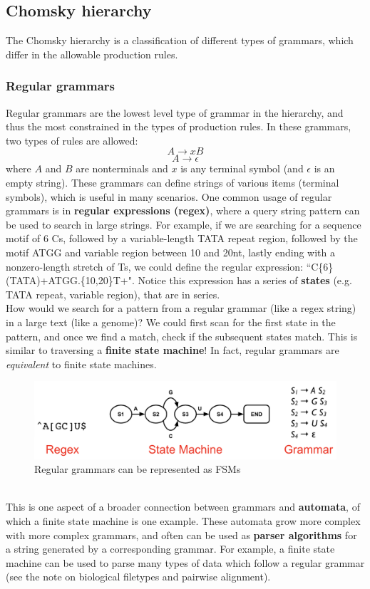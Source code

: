 \documentclass[12pt]{article}
\begin{document}
\subsection{Chomsky hierarchy}
The Chomsky hierarchy is a classification of different types of grammars, which differ in the allowable production rules.
\subsubsection{Regular grammars}
Regular grammars are the lowest level type of grammar in the hierarchy, and thus the most constrained in the types of production rules. In these grammars, two types of rules are allowed:
$$A \rightarrow xB$$
$$A \rightarrow \epsilon$$
where $A$ and $B$ are nonterminals and $x$ is any terminal symbol (and $\epsilon$ is an empty string). These grammars can define strings of various items (terminal symbols), which is useful in many scenarios. One common usage of regular grammars is in \textbf{regular expressions (regex)}, where a query string pattern can be used to search in large strings. For example, if we are searching for a sequence motif of 6 Cs, followed by a variable-length TATA repeat region, followed by the motif ATGG and variable region between 10 and 20nt, lastly ending with a nonzero-length stretch of Ts, we could define the regular expression: ``C\{6\}(TATA)+ATGG.\{10,20\}T+". Notice this expression has a series of \textbf{states} (e.g. TATA repeat, variable region), that are in series.\\[10pt]
How would we search for a pattern from a regular grammar (like a regex string) in a large text (like a genome)? We could first scan for the first state in the pattern, and once we find a match, check if the subsequent states match. This is similar to traversing a \textbf{finite state machine}! In fact, regular grammars are \textit{equivalent} to finite state machines.
\begin{figure}[h]
    \centering
    \includegraphics[width=.8\linewidth]{grammar.png}
    \caption{Regular grammars can be represented as FSMs}
    \label{fig:my_label}
\end{figure}\\[10pt]
This is one aspect of a broader connection between grammars and \textbf{automata}, of which a finite state machine is one example. These automata grow more complex with more complex grammars, and often can be used as \textbf{parser algorithms} for a string generated by a corresponding grammar. For example, a finite state machine can be used to parse many types of data which follow a regular grammar (see the note on biological filetypes and pairwise alignment).
\end{document}
